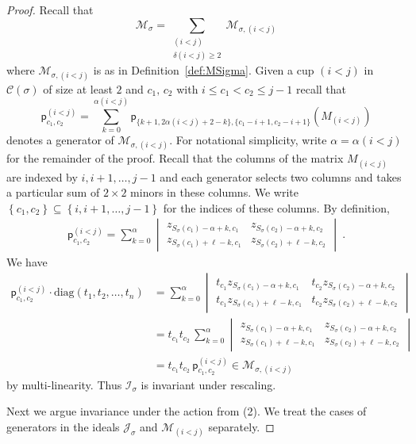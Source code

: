\documentclass[11pt]{amsart}
\theoremstyle{remark}
\theoremstyle{remark}
\theoremstyle{definition}
\theoremstyle{definition}
\theoremstyle{definition}
\numberwithin{equation}{section}
\newcommand{\gd}{\delta}
\newcommand{\gs}{\sigma}
\newcommand{\cc}{\mathcal{C}}
\newcommand{\ci}{\mathcal{I}}
\newcommand{\cj}{\mathcal{J}}
\newcommand{\cm}{\mathcal{M}}
\newcommand{\al}{\alpha}
\newcommand{\pl}{\mathsf{p}}
\newcommand{\cupsigma}{\cc(\gs)}
\begin{document}
\begin{proof}
Recall that 
\[
\cm_\gs = \sum_{\substack{(i<j)\\ \gd(i<j)\geq 2}} \cm_{\gs, (i<j)}
\]
where $\cm_{\gs, (i<j)}$ is as in Definition~\ref{def:MSigma}.
Given a cup $(i<j)$ in $\cupsigma$ of size at least $2$ and $c_1,\,c_2$ with $i\leq c_1<c_2\leq j-1$ recall that
\[
\pl_{c_1,c_2}^{(i<j)}= \sum_{k=0}^{\al(i<j)}\pl_{\{k+1, 2\al(i<j)+2-k\}, \{c_1-i+1,c_2-i+1\}} (M_{(i<j)})
\]
denotes a generator of $\cm_{\gs,(i<j)}$. For notational simplicity, write $\al=\al(i<j)$ for the remainder of the proof. Recall that the columns of the matrix $M_{(i<j)}$ are indexed by $i,i+1,\dots, j-1$ and each generator selects two columns and takes a particular sum of $2\times 2$ minors in these columns. We write $\left\{c_1, c_2\right\}\subseteq \left\{i, i+1, \dots, j-1\right\}$ for the indices of these columns. By definition,
\begin{align}\label{eqn.sum}
\pl_{c_1,c_2}^{(i<j)}= \sum_{k=0}^{\al} \begin{vmatrix}
    z_{S_\sigma(c_1)-\al+k, c_1}&z_{S_\sigma(c_2)-\al+k, c_2}\\
    z_{S_\sigma(c_1)+\ell-k, c_1} &  z_{S_\sigma(c_2)+\ell-k, c_2}
\end{vmatrix} \ .
\end{align}
We have
\begin{align*}
\pl_{c_1,c_2}^{(i<j)} \cdot \mathrm{diag}(t_1, t_2, \ldots, t_n) &=\displaystyle\sum_{k=0}^{\al}\begin{vmatrix}
          t_{c_1}z_{S_\sigma(c_1)-\al+k, c_1}& t_{c_2}z_{S_\sigma(c_2)-\al+k, c_2}\\
    t_{c_1} z_{S_\gs(c_1)+\ell-k, c_1} &  t_{c_2} z_{S_\gs(c_2)+\ell-k, c_2}   
        \end{vmatrix}\\
        &=t_{c_1}t_{c_2}\, \displaystyle\sum_{k=0}^{\al} \begin{vmatrix}
          z_{S_\sigma(c_1)-\al+k, c_1}& z_{S_\sigma(c_2)-\al+k, c_2}\\ z_{S_\gs(c_1)+\ell-k, c_1} &   z_{S_\gs(c_2)+\ell-k, c_2}   
        \end{vmatrix} \\
        &= t_{c_1}t_{c_2}\, \pl_{c_1,c_2}^{(i<j)}\in\cm_{\gs,(i<j)}
\end{align*}
by multi-linearity.
Thus $\ci_\gs$ is invariant under rescaling. 


Next we argue invariance under the action from (2). We treat the cases of generators in the ideals $\cj_\gs$ and $\cm_{(i<j)}$ separately. 


\end{proof}
\end{document}
